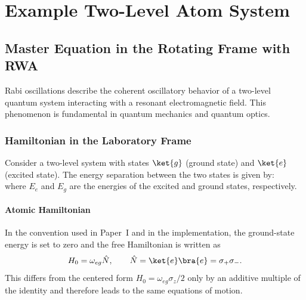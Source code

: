 \chapter{Example Two-Level Atom System} %

\label{chapter_rabi_oscillations} %


\section{Master Equation in the Rotating Frame with RWA}

Rabi oscillations describe the coherent oscillatory behavior of a two-level quantum system interacting with a resonant electromagnetic field.
This phenomenon is fundamental in quantum mechanics and quantum optics.


\subsection{Hamiltonian in the Laboratory Frame}
Consider a two-level system with states \(\ket{g}\) (ground state) and \(\ket{e}\) (excited state).
The energy separation between the two states is given by:
\begin{equation}
	\label{eq:EnergySeparation}
\end{equation}
where \(E_e\) and \(E_g\) are the energies of the excited and ground states, respectively.

\subsubsection{Atomic Hamiltonian}
In the convention used in Paper~I and in the implementation, the ground-state energy is set to zero and the free Hamiltonian is written as
\begin{equation}
	H_0 = \omega_{eg}\hat{N}, \qquad \hat{N} = \ket{e}\bra{e} = \sigma_+\sigma_-.
	\label{eq:AtomicHamiltonian}
\end{equation}
This differs from the centered form \(H_0 = \omega_{eg}\sigma_z/2\) only by an additive multiple of the identity and therefore leads to the same equations of motion.


